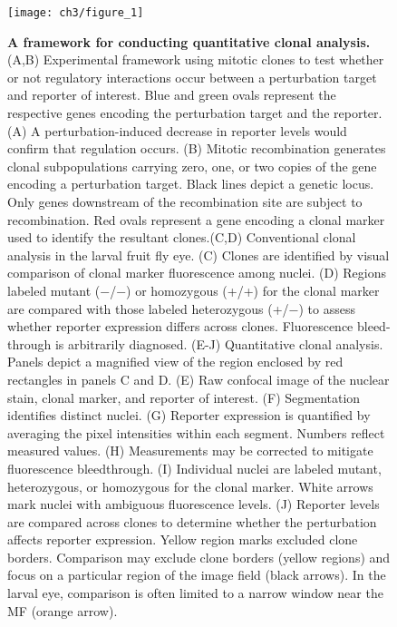 \begin{figure}[h]
\texttt{[image: ch3/figure\_1]}
\caption[A framework for conducting quantitative clonal analysis.]{\textbf{A framework for conducting quantitative clonal analysis.} (A,B) Experimental framework using mitotic clones to test whether or not regulatory interactions occur between a perturbation target and reporter of interest. Blue and green ovals represent the respective genes encoding the perturbation target and the reporter. (A) A perturbation-induced decrease in reporter levels would confirm that regulation occurs. (B) Mitotic recombination generates clonal subpopulations carrying zero, one, or two copies of the gene encoding a perturbation target. Black lines depict a genetic locus. Only genes downstream of the recombination site are subject to recombination. Red ovals represent a gene encoding a clonal marker used to identify the resultant clones.(C,D) Conventional clonal analysis in the larval fruit fly eye. (C) Clones are identified by visual comparison of clonal marker fluorescence among nuclei. (D) Regions labeled mutant (−/−) or homozygous (+/+) for the clonal marker are compared with those labeled heterozygous (+/−) to assess whether reporter expression differs across clones. Fluorescence bleed-through is arbitrarily diagnosed. (E-J) Quantitative clonal analysis. Panels depict a magnified view of the region enclosed by red rectangles in panels C and D. (E) Raw confocal image of the nuclear stain, clonal marker, and reporter of interest. (F) Segmentation identifies distinct nuclei. (G) Reporter expression is quantified by averaging the pixel intensities within each segment. Numbers reflect measured values. (H) Measurements may be corrected to mitigate fluorescence bleedthrough. (I) Individual nuclei are labeled mutant, heterozygous, or homozygous for the clonal marker. White arrows mark nuclei with ambiguous fluorescence levels. (J) Reporter levels are compared across clones to determine whether the perturbation affects reporter expression. Yellow region marks excluded clone borders. Comparison may exclude clone borders (yellow regions) and focus on a particular region of the image field (black arrows). In the larval eye, comparison is often limited to a narrow window near the MF (orange arrow).}
\label{fig:ch3:fig1}
\end{figure}

